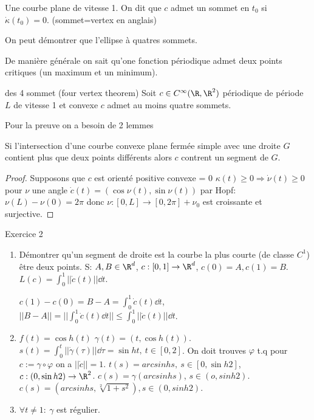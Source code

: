 		\begin{definition}
			Une courbe plane de vitesse 1. On dit que $c$ admet un sommet en $t_0$ si $\dot \kappa(t_0)=0$. (sommet=vertex en anglais)
		\end{definition}

		\begin{examplebox}
			On peut démontrer que l'ellipse à quatres sommets.
		\end{examplebox}

		\begin{remark}
			De manière générale on sait qu'one fonction périodique admet deux points critiques (un maximum et un minimum).
		\end{remark}

		\begin{theorem}{des 4 sommet (four vertex theorem)}
			Soit $c\in C^\infty(\R, \R^2)$ périodique de période $L$ de vitesse 1 et convexe $c$ admet au moins quatre sommets. 
		\end{theorem}

		Pour la preuve on a besoin de 2 lemmes

		\begin{lemme}
			Si l'intersection d'une courbe convexe plane fermée simple avec une droite $G$ contient plus que deux points différents alors $c$ contrent un segment de $G$.
		\end{lemme}

		\begin{remark}
		\end{remark}

		\begin{proof}
			Supposons que $c$ est orienté positive convexe = 0 $\kappa(t)\geq 0 \Rightarrow \dot\nu (t)\geq 0$ pour $\nu$ une angle $\dot c(t)=(\cos \nu(t),\sin \nu(t))$ par Hopf: $\nu(L)-\nu(0)=2\pi$ donc $\nu:[0,L]\rightarrow[0,2\pi]+\nu_0$ est croissante et surjective.
		\end{proof}

		Exercice 2
		\begin{enumerate}
			\item Démontrer qu'un segment de droite est la courbe la plus courte (de classe $C^1$) être deux points.
			S: $A,B\in \R^d$, $c:[0,1]\rightarrow \R^d$, $c(0)=A, c(1)=B$. $L(c)=\int_0^1||\dot c(t)||\dd t$.
	
			$c(1)-c(0)=B-A=\int_0^1\dot c(t)\dd t$, $||B-A||=||\int_0^1\dot c(t)\dd t||\leq \int_0^1||\dot c(t) ||\dd t$.
			\item $f(t)=\cos h (t)$ $\gamma (t)=(t, \cos h (t))$. $s(t)=\int_0^t ||\dot \gamma(\tau)|| \dd \tau=\sin h t,\ t\in[0,2]$. On doit trouves $\varphi$ t.q pour $c:=\gamma\circ\varphi$ on a $||\dot c||=1$. $t(s)=arcsin h s,\ s\in[0,\sin h 2]$, $c:(0, \sin h 2)\rightarrow \R^2$. $c(s)=\gamma(arcsinh s)$, $s\in(o, sinh 2)$. $c(s)=(arcsin h s, \sqrt[2]{1+s^2}), s\in(0, sin h2)$.
			\item $\forall t\neq 1:\ \gamma$ est régulier.
		\end{enumerate}

